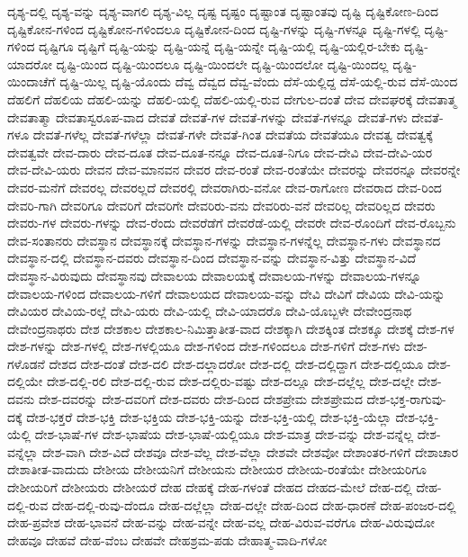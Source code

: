 {ದೃಶ್ಯ-ದಲ್ಲಿ
ದೃಶ್ಯ-ವನ್ನು
ದೃಶ್ಯ-ವಾಗಲಿ
ದೃಶ್ಯ-ವಿಲ್ಲ
ದೃಷ್ಟ
ದೃಷ್ಟಂ
ದೃಷ್ಟಾಂತ
ದೃಷ್ಟಾಂತವು
ದೃಷ್ಟಿ
ದೃಷ್ಟಿಕೋಣ-ದಿಂದ
ದೃಷ್ಟಿಕೋನ-ಗಳಿಂದ
ದೃಷ್ಟಿಕೋನ-ಗಳಿಂದಲೂ
ದೃಷ್ಟಿಕೋನ-ದಿಂದ
ದೃಷ್ಟಿ-ಗಳನ್ನು
ದೃಷ್ಟಿ-ಗಳನ್ನೂ
ದೃಷ್ಟಿ-ಗಳಲ್ಲಿ
ದೃಷ್ಟಿ-ಗಳಿಂದ
ದೃಷ್ಟಿಗೂ
ದೃಷ್ಟಿಗೆ
ದೃಷ್ಟಿ-ಯನ್ನು
ದೃಷ್ಟಿ-ಯನ್ನೆ
ದೃಷ್ಟಿ-ಯನ್ನೇ
ದೃಷ್ಟಿ-ಯಲ್ಲಿ
ದೃಷ್ಟಿ-ಯಲ್ಲಿರ-ಬೇಕು
ದೃಷ್ಟಿ-ಯಾದರೋ
ದೃಷ್ಟಿ-ಯಿಂದ
ದೃಷ್ಟಿ-ಯಿಂದಲೂ
ದೃಷ್ಟಿ-ಯಿಂದಲೇ
ದೃಷ್ಟಿ-ಯಿಂದಲೋ
ದೃಷ್ಟಿ-ಯಿಂದಲ್ಲ
ದೃಷ್ಟಿ-ಯಿಂದಾಚೆಗೆ
ದೃಷ್ಟಿ-ಯಿಲ್ಲ
ದೃಷ್ಟಿ-ಯೊಂದು
ದೆವ್ವ
ದೆವ್ವದ
ದೆವ್ವ-ವೆಂದು
ದೆಸೆ-ಯಲ್ಲಿದ್ದ
ದೆಸೆ-ಯಲ್ಲಿ-ರುವ
ದೆಸೆ-ಯಿಂದ
ದೆಹಲಿಗೆ
ದೆಹಲಿಯ
ದೆಹಲಿ-ಯನ್ನು
ದೆಹಲಿ-ಯಲ್ಲಿ
ದೆಹಲಿ-ಯಲ್ಲಿ-ರುವ
ದೇಗುಲ-ದಂತೆ
ದೇವ
ದೇವಘರಕ್ಕೆ
ದೇವತಾತ್ಮ
ದೇವತಾತ್ಮಾ
ದೇವತಾಸ್ವರೂಪ-ವಾದ
ದೇವತೆ
ದೇವತೆ-ಗಳ
ದೇವತೆ-ಗಳನ್ನು
ದೇವತೆ-ಗಳನ್ನೂ
ದೇವತೆ-ಗಳು
ದೇವತೆ-ಗಳೂ
ದೇವತೆ-ಗಳೆಲ್ಲ
ದೇವತೆ-ಗಳೆಲ್ಲಾ
ದೇವತೆ-ಗಳೇ
ದೇವತೆ-ಗಿಂತ
ದೇವತೆಯ
ದೇವತೆಯೂ
ದೇವತ್ವ
ದೇವತ್ವಕ್ಕೆ
ದೇವತ್ವವೇ
ದೇವ-ದಾರು
ದೇವ-ದೂತ
ದೇವ-ದೂತ-ನನ್ನೂ
ದೇವ-ದೂತ-ನಿಗೂ
ದೇವ-ದೇವಿ
ದೇವ-ದೇವಿ-ಯರ
ದೇವ-ದೇವಿ-ಯರು
ದೇವನ
ದೇವ-ಮಾನವನ
ದೇವರ
ದೇವ-ರಂತೆ
ದೇವ-ರಂತೆಯೇ
ದೇವರನ್ನು
ದೇವರನ್ನೂ
ದೇವರನ್ನೇ
ದೇವರ-ಮನೆಗೆ
ದೇವರಲ್ಲ
ದೇವರಲ್ಲದೆ
ದೇವರಲ್ಲಿ
ದೇವರಾಗಿರು-ವನೋ
ದೇವ-ರಾಗೋಣ
ದೇವರಾದ
ದೇವ-ರಿಂದ
ದೇವರಿ-ಗಾಗಿ
ದೇವರಿಗೂ
ದೇವರಿಗೆ
ದೇವರಿಗೇ
ದೇವರಿರು-ವನು
ದೇವರಿರು-ವನೆ
ದೇವರಿಲ್ಲ
ದೇವರಿಲ್ಲದ
ದೇವರು
ದೇವರು-ಗಳ
ದೇವರು-ಗಳನ್ನು
ದೇವ-ರೆಂದು
ದೇವರೆಡೆಗೆ
ದೇವರೆಡೆ-ಯಲ್ಲಿ
ದೇವರೇ
ದೇವ-ರೊಂದಿಗೆ
ದೇವ-ರೊಬ್ಬನು
ದೇವ-ಸಂತಾನರು
ದೇವಸ್ಥಾನ
ದೇವಸ್ಥಾನಕ್ಕೆ
ದೇವಸ್ಥಾನ-ಗಳನ್ನು
ದೇವಸ್ಥಾನ-ಗಳನ್ನೆಲ್ಲ
ದೇವಸ್ಥಾನ-ಗಳು
ದೇವಸ್ಥಾನದ
ದೇವಸ್ಥಾನ-ದಲ್ಲಿ
ದೇವಸ್ಥಾನ-ದವರು
ದೇವಸ್ಥಾನ-ದಿಂದ
ದೇವಸ್ಥಾನ-ವನ್ನು
ದೇವಸ್ಥಾನ-ವಿತ್ತು
ದೇವಸ್ಥಾನ-ವಿದೆ
ದೇವಸ್ಥಾನ-ವಿರುವುದು
ದೇವಸ್ಥಾನವು
ದೇವಾಲಯ
ದೇವಾಲಯಕ್ಕೆ
ದೇವಾಲಯ-ಗಳನ್ನು
ದೇವಾಲಯ-ಗಳನ್ನೂ
ದೇವಾಲಯ-ಗಳಿಂದ
ದೇವಾಲಯ-ಗಳಿಗೆ
ದೇವಾಲಯದ
ದೇವಾಲಯ-ವನ್ನು
ದೇವಿ
ದೇವಿಗೆ
ದೇವಿಯ
ದೇವಿ-ಯನ್ನು
ದೇವಿಯರ
ದೇವಿಯ-ರಲ್ಲೆ
ದೇವಿ-ಯರು
ದೇವಿ-ಯಲ್ಲಿ
ದೇವಿ-ಯಾದರೊ
ದೇವಿ-ಯೊಬ್ಬಳೇ
ದೇವೇಂದ್ರನಾಥ
ದೇವೇಂದ್ರನಾಥರು
ದೇಶ
ದೇಶಕಾಲ
ದೇಶಕಾಲ-ನಿಮಿತ್ತಾತೀತ-ವಾದ
ದೇಶಕ್ಕಾಗಿ
ದೇಶಕ್ಕಿಂತ
ದೇಶಕ್ಕೂ
ದೇಶಕ್ಕೆ
ದೇಶ-ಗಳ
ದೇಶ-ಗಳನ್ನು
ದೇಶ-ಗಳಲ್ಲಿ
ದೇಶ-ಗಳಲ್ಲಿಯೂ
ದೇಶ-ಗಳಿಂದ
ದೇಶ-ಗಳಿಂದಲೂ
ದೇಶ-ಗಳಿಗೆ
ದೇಶ-ಗಳು
ದೇಶ-ಗಳೊಡನೆ
ದೇಶದ
ದೇಶ-ದಂತೆ
ದೇಶ-ದಲಿ
ದೇಶ-ದಲ್ಲಾದರೋ
ದೇಶ-ದಲ್ಲಿ
ದೇಶ-ದಲ್ಲಿದ್ದಾಗ
ದೇಶ-ದಲ್ಲಿಯೂ
ದೇಶ-ದಲ್ಲಿಯೇ
ದೇಶ-ದಲ್ಲಿ-ರಲಿ
ದೇಶ-ದಲ್ಲಿ-ರುವ
ದೇಶ-ದಲ್ಲಿರು-ವಷ್ಟು
ದೇಶ-ದಲ್ಲೂ
ದೇಶ-ದಲ್ಲೆಲ್ಲ
ದೇಶ-ದಲ್ಲೇ
ದೇಶ-ದವನು
ದೇಶ-ದವರನ್ನು
ದೇಶ-ದವರಿಗೆ
ದೇಶ-ದವರು
ದೇಶ-ದಿಂದ
ದೇಶಪ್ರೇಮ
ದೇಶಪ್ರೇಮದ
ದೇಶ-ಭಕ್ತ-ರಾಗುವು-ದಕ್ಕೆ
ದೇಶ-ಭಕ್ತರೆ
ದೇಶ-ಭಕ್ತಿ
ದೇಶ-ಭಕ್ತಿಯ
ದೇಶ-ಭಕ್ತಿ-ಯನ್ನು
ದೇಶ-ಭಕ್ತಿ-ಯಲ್ಲಿ
ದೇಶ-ಭಕ್ತಿ-ಯೆಲ್ಲಾ
ದೇಶ-ಭಕ್ತಿ-ಯೆಲ್ಲಿ
ದೇಶ-ಭಾಷೆ-ಗಳ
ದೇಶ-ಭಾಷೆಯ
ದೇಶ-ಭಾಷೆ-ಯಲ್ಲಿಯೂ
ದೇಶ-ಮಾತ್ರ
ದೇಶ-ವನ್ನು
ದೇಶ-ವನ್ನೆಲ್ಲ
ದೇಶ-ವನ್ನೆಲ್ಲಾ
ದೇಶ-ವಾಗಿ
ದೇಶ-ವಿದೆ
ದೇಶವೂ
ದೇಶ-ವೆಲ್ಲ
ದೇಶ-ವೆಲ್ಲಾ
ದೇಶವೇ
ದೇಶವೋ
ದೇಶಾಂತರ-ಗಳಿಗೆ
ದೇಶಾಚಾರ
ದೇಶಾತೀತ-ವಾದುದು
ದೇಶೀಯ
ದೇಶೀಯನಿಗೆ
ದೇಶೀಯನು
ದೇಶೀಯರ
ದೇಶೀಯ-ರಂತೆಯೇ
ದೇಶೀಯರಿಗೂ
ದೇಶೀಯರಿಗೆ
ದೇಶೀಯರು
ದೇಶೀಯರೆ
ದೇಹ
ದೇಹಕ್ಕೆ
ದೇಹ-ಗಳಂತೆ
ದೇಹದ
ದೇಹದ-ಮೇಲೆ
ದೇಹ-ದಲ್ಲಿ
ದೇಹ-ದಲ್ಲಿ-ರುವ
ದೇಹ-ದಲ್ಲಿ-ರುವು-ದೆಂದೂ
ದೇಹ-ದಲ್ಲೆಲ್ಲಾ
ದೇಹ-ದಲ್ಲೇ
ದೇಹ-ದಿಂದ
ದೇಹ-ಧಾರಣೆ
ದೇಹ-ಪಂಜರ-ದಲ್ಲಿ
ದೇಹ-ಪ್ರವೇಶ
ದೇಹ-ಭಾವನೆ
ದೇಹ-ವನ್ನು
ದೇಹ-ವನ್ನೇ
ದೇಹ-ವಲ್ಲ
ದೇಹ-ವಿರುವ-ವರೆಗೂ
ದೇಹ-ವಿರುವುದೋ
ದೇಹವೂ
ದೇಹವೆ
ದೇಹ-ವೆಂಬ
ದೇಹವೇ
ದೇಹಶ್ರಮ-ಪಡು
ದೇಹಾತ್ಮ-ವಾದಿ-ಗಳೋ
}
